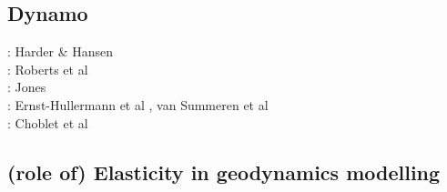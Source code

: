 \subsection{Dynamo}

\begin{scriptsize}
\twothousandfive: Harder \& Hansen \cite{haha05}\\
\twothousandnine: Roberts et al \cite{rolm09}\\
\twothousandeleven: Jones \cite{jone11}\\
\twothousandthirteen: Ernst-Hullermann et al \cite{erhh13}, van Summeren et al \cite{vagc13}\\
\twothousandsixteen: Choblet et al \cite{chah16}
\end{scriptsize}

\subsection{(role of) Elasticity in geodynamics modelling}

